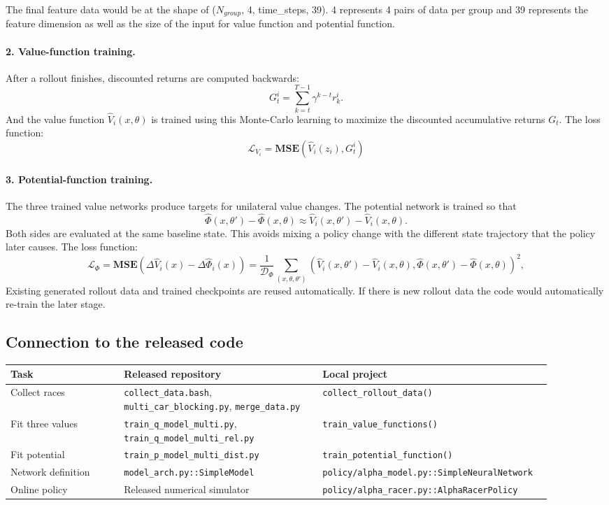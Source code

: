\documentclass[11pt]{article}
\newcommand{\code}[1]{\texttt{#1}}
\begin{document}
The final feature data would be at the shape of ($N_{group}$, 4, time\_steps, 39). 4 represents 4 pairs of data per group and 39 represents the feature dimension as well as the size of the input for value function and potential function.

\paragraph{2. Value-function training.}
After a rollout finishes, discounted returns are computed backwards:
\[
  G^i_t=\sum_{k=t}^{T-1}\gamma^{k-t}r^i_k.
\]
And the value function $\widehat{V}_i(x,\theta)$ is trained using this Monte-Carlo learning to maximize the discounted accumulative returns $G_t$. The loss function:
\[
\mathcal{L}_{V_i}=\mathbf{MSE}(\widehat{V}_i(z_i),G^i_t)
\]

\paragraph{3. Potential-function training.}
The three trained value networks produce targets for unilateral value changes.
The potential network is trained so that
\[
  \widehat\Phi(x,\theta')-\widehat\Phi(x,\theta)
  \approx
  \widehat V_i(x,\theta')-\widehat V_i(x,\theta).
\]
Both sides are evaluated at the same baseline state. This avoids mixing a policy
change with the different state trajectory that the policy later causes.
The loss function:
\[
\mathcal{L}_{\Phi}=\mathbf{MSE}(\Delta \widehat V_i(x)-\Delta \widehat \Phi_i(x))
=
\frac{1}{\mathcal D_\Phi}\sum_{(x,\theta,\theta')}(\widehat V_i(x,\theta')-\widehat V_i(x,\theta),
\widehat\Phi(x,\theta')-\widehat\Phi(x,\theta))^2,
\]
Existing generated rollout data and trained checkpoints are reused automatically. If there is new rollout data the code would automatically re-train the later stage.

\subsection{Connection to the released code}

\begin{center}
\small
\begin{tabular}{p{0.20\linewidth}p{0.35\linewidth}p{0.35\linewidth}}
\toprule
Task & Released repository & Local project \\
\midrule
Collect races &
\code{collect\_data.bash}, \code{multi\_car\_blocking.py},
\code{merge\_data.py} &
\code{collect\_rollout\_data()} \\
Fit three values &
\code{train\_q\_model\_multi.py},
\code{train\_q\_model\_multi\_rel.py} &
\code{train\_value\_functions()} \\
Fit potential &
\code{train\_p\_model\_multi\_dist.py} &
\code{train\_potential\_function()} \\
Network definition &
\code{model\_arch.py::SimpleModel} &
\code{policy/alpha\_model.py::SimpleNeuralNetwork} \\
Online policy &
Released numerical simulator &
\code{policy/alpha\_racer.py::AlphaRacerPolicy} \\
\bottomrule
\end{tabular}
\end{center}
\end{document}
